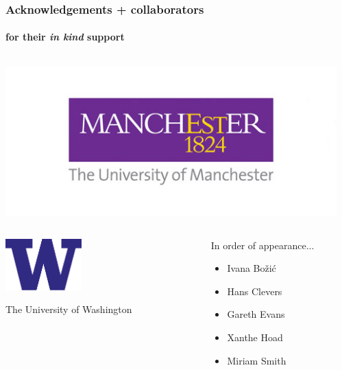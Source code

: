 \documentclass{beamer}
\begin{document}
\begin{frame}
    \frametitle{Acknowledgements + collaborators}
    \framesubtitle{for their \emph{in kind} support}
    \begin{columns}
        \begin{column}{0.5\textwidth}
        \includegraphics[width=\textwidth]{figures/logo_big.jpg}
        \end{column}
        \begin{column}{0.5\textwidth}

        \end{column}
    \end{columns}
    \begin{columns}
        \begin{column}{0.5\textwidth}
        \begin{center}
        \includegraphics[width=0.4\textwidth]{figures/W-Logo_Purple1}
        \end{center}

        The University of Washington
        \end{column}
        \begin{column}{0.5\textwidth}
        In order of appearance...

        \begin{itemize}
            \item Ivana Bo\v{z}i\'{c}
            \item Hans Clevers
            \item Gareth Evans
            \item Xanthe Hoad
            \item Miriam Smith
        \end{itemize}

        \end{column}
    \end{columns}

\end{frame}

\end{document}
